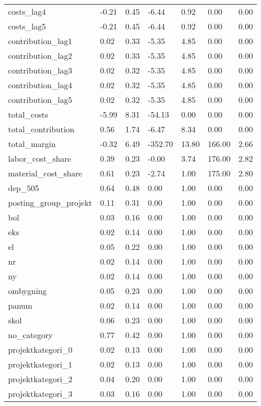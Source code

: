\begin{landscape}
\begin{longtable}[h!]{lllllll}
costs_lag4 & -0.21 & 0.45 & -6.44 & 0.92 & 0.00 & 0.00 \\
costs_lag5 & -0.21 & 0.45 & -6.44 & 0.92 & 0.00 & 0.00 \\
contribution_lag1 & 0.02 & 0.33 & -5.35 & 4.85 & 0.00 & 0.00 \\
contribution_lag2 & 0.02 & 0.33 & -5.35 & 4.85 & 0.00 & 0.00 \\
contribution_lag3 & 0.02 & 0.32 & -5.35 & 4.85 & 0.00 & 0.00 \\
contribution_lag4 & 0.02 & 0.32 & -5.35 & 4.85 & 0.00 & 0.00 \\
contribution_lag5 & 0.02 & 0.32 & -5.35 & 4.85 & 0.00 & 0.00 \\
total_costs & -5.99 & 8.31 & -54.13 & 0.00 & 0.00 & 0.00 \\
total_contribution & 0.56 & 1.74 & -6.47 & 8.34 & 0.00 & 0.00 \\
total_margin & -0.32 & 6.49 & -352.70 & 13.80 & 166.00 & 2.66 \\
labor_cost_share & 0.39 & 0.23 & -0.00 & 3.74 & 176.00 & 2.82 \\
material_cost_share & 0.61 & 0.23 & -2.74 & 1.00 & 175.00 & 2.80 \\
dep_505 & 0.64 & 0.48 & 0.00 & 1.00 & 0.00 & 0.00 \\
posting_group_projekt & 0.11 & 0.31 & 0.00 & 1.00 & 0.00 & 0.00 \\
bol & 0.03 & 0.16 & 0.00 & 1.00 & 0.00 & 0.00 \\
eks & 0.02 & 0.14 & 0.00 & 1.00 & 0.00 & 0.00 \\
el & 0.05 & 0.22 & 0.00 & 1.00 & 0.00 & 0.00 \\
nr & 0.02 & 0.14 & 0.00 & 1.00 & 0.00 & 0.00 \\
ny & 0.02 & 0.14 & 0.00 & 1.00 & 0.00 & 0.00 \\
ombygning & 0.05 & 0.23 & 0.00 & 1.00 & 0.00 & 0.00 \\
panum & 0.02 & 0.14 & 0.00 & 1.00 & 0.00 & 0.00 \\
skol & 0.06 & 0.23 & 0.00 & 1.00 & 0.00 & 0.00 \\
no_category & 0.77 & 0.42 & 0.00 & 1.00 & 0.00 & 0.00 \\
projektkategori_0 & 0.02 & 0.13 & 0.00 & 1.00 & 0.00 & 0.00 \\
projektkategori_1 & 0.02 & 0.13 & 0.00 & 1.00 & 0.00 & 0.00 \\
projektkategori_2 & 0.04 & 0.20 & 0.00 & 1.00 & 0.00 & 0.00 \\
projektkategori_3 & 0.03 & 0.16 & 0.00 & 1.00 & 0.00 & 0.00 \\

\end{longtable}
\end{landscape}
